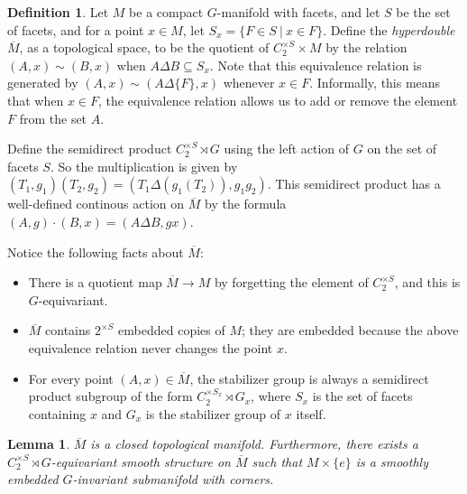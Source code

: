 \documentclass[11pt]{amsart}
\newtheorem{lem}{Lemma}[section]
\theoremstyle{definition}
\newtheorem{defn}{Definition}[section]
\numberwithin{equation}{section}
\numberwithin{figure}{section}
\newcommand{\ourdefn}[1]{{\it #1}}
\begin{document}
\begin{defn}\label{hyperdouble}
	Let $M$ be a compact $G$-manifold with facets, and let $S$ be the set of facets, and for a point $x\in M$, let $S_x=\{F\in S\ |\ x\in F\}$. Define the \ourdefn{hyperdouble} $\overline{M}$, as a topological space, to be  the quotient of $C_2^{\times S} \times M$ by the relation $(A, x)\sim (B, x)$ when $A\Delta B\subseteq S_x$. Note that this equivalence relation is generated by $(A, x)\sim (A\Delta \{F\}, x)$ whenever $x\in F$. Informally, this means that when $x \in F$, the equivalence relation allows us to add or remove the element $F$ from the set $A$.
	
	
	Define the semidirect product $C_2^{\times S} \rtimes G$ using the left action of $G$ on the set of facets $S$. So the multiplication is given by $(T_1,g_1)(T_2,g_2) = (T_1 \Delta  (g_1(T_2)), g_1g_2)$. This semidirect product has a well-defined continous action on $\overline{M}$ by the formula $(A,g) \cdot (B,x) = (A \Delta B, gx)$.
\end{defn}

Notice the following facts about $\overline{M}$:
\begin{itemize}
	\item There is a quotient map $\overline{M} \to M$ by forgetting the element of $C_2^{\times S}$, and this is $G$-equivariant.
	\item $\overline{M}$ contains $2^{\times S}$ embedded copies of $M$; they are embedded because the above equivalence relation never changes the point $x$.
	\item For every point $(A,x) \in \overline{M}$, the stabilizer group is always a semidirect product subgroup of the form $C_2^{\times S_x} \rtimes G_x$, where $S_x$ is the set of facets containing $x$ and $G_x$ is the stabilizer group of $x$ itself.
\end{itemize}

\begin{lem}\label{hyperdouble_top_mfld}\label{hyperdouble_smooth_mfld}
	$\overline{M}$ is a closed topological manifold. Furthermore, there exists a $C_2^{\times S} \rtimes G$-equivariant smooth structure on $\overline{M}$ such that $M \times \{e\}$ is a smoothly embedded $G$-invariant submanifold with corners.
\end{lem}
\end{document}
